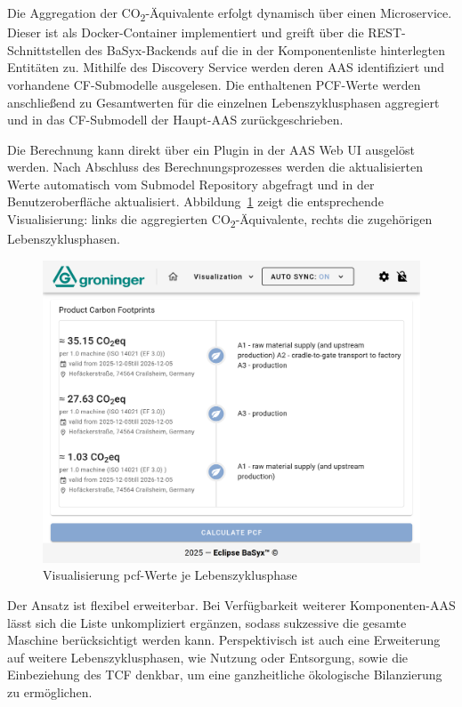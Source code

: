 Die Aggregation der CO\textsubscript{2}-Äquivalente erfolgt dynamisch über einen Microservice. 
Dieser ist als Docker-Container implementiert und greift über die REST-Schnittstellen des BaSyx-Backends auf die in der Komponentenliste hinterlegten Entitäten zu. 
Mithilfe des Discovery Service werden deren AAS identifiziert und vorhandene CF-Submodelle ausgelesen. 
Die enthaltenen PCF-Werte werden anschließend zu Gesamtwerten für die einzelnen Lebenszyklusphasen aggregiert und in das CF-Submodell der Haupt-AAS zurückgeschrieben.

Die Berechnung kann direkt über ein Plugin in der AAS Web UI ausgelöst werden.
Nach Abschluss des Berechnungsprozesses werden die aktualisierten Werte automatisch vom Submodel Repository abgefragt und in der Benutzeroberfläche aktualisiert. 
\pagebreak
Abbildung~\ref{fig:PluginAggregation} zeigt die entsprechende Visualisierung: links die aggregierten CO\textsubscript{2}-Äquivalente, rechts die zugehörigen Lebenszyklusphasen.

\vspace{0.5em}
\begin{figure}[htbp]
    \centering
        \includegraphics[width=1\textwidth]{Bilder/ErgebnisseAASWebUI/CarbonFootprint.png}
    \caption{Visualisierung \acs{pcf}-Werte je Lebenszyklusphase}
    \label{fig:PluginAggregation}
\end{figure}
\vspace{-0.2em}

Der Ansatz ist flexibel erweiterbar.
Bei Verfügbarkeit weiterer Komponenten-AAS lässt sich die Liste unkompliziert ergänzen, sodass sukzessive die gesamte Maschine berücksichtigt werden kann. 
Perspektivisch ist auch eine Erweiterung auf weitere Lebenszyklusphasen, wie Nutzung oder Entsorgung, sowie die Einbeziehung des TCF denkbar, um eine ganzheitliche ökologische Bilanzierung zu ermöglichen.

